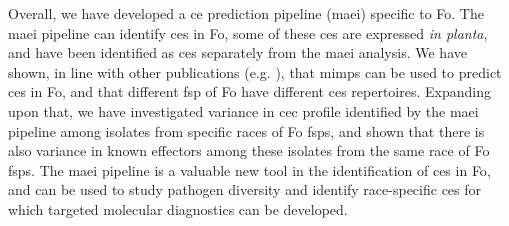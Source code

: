 Overall, we have developed a \acl{ce} prediction pipeline (\ac{maei}) specific to \ac{Fo}. The \ac{maei} pipeline can identify \acp{ce} in \ac{Fo}, some of these \acp{ce} are expressed \textit{in planta}, and have been identified as \acp{ce} separately from the \ac{maei} analysis. We have shown, in line with other publications (e.g. \textcite{Schmidt2013, Dam2016, FoEC2}), that  \acp{mimp} can be used to predict \acp{ce} in \ac{Fo}, and that different \ac{fsp} of \ac{Fo} have different \acp{ce} repertoires. Expanding upon that, we have investigated variance in \ac{cec} profile identified by the \ac{maei} pipeline among isolates from specific races of \ac{Fo} \acp{fsp}, and shown that there is also variance in known effectors among these isolates from the same race of \ac{Fo} \acp{fsp}. The \ac{maei} pipeline is a valuable new tool in the identification of \acp{ce} in \ac{Fo}, and can be used to study pathogen diversity and identify race-specific \acp{ce} for which targeted molecular diagnostics can be developed. 
